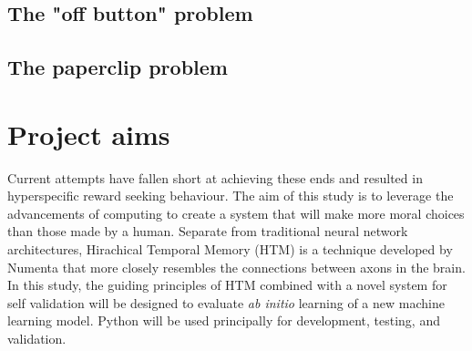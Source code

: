 \subsection{The "off button" problem}
\subsection{The paperclip problem}

\section{Project aims}
Current attempts have fallen short at achieving these ends and resulted in hyperspecific reward seeking behaviour.
The aim of this study is to leverage the advancements of computing to create a system that will make more moral choices than those made by a human.
Separate from traditional neural network architectures, Hirachical Temporal Memory (HTM) is a technique developed by Numenta that more closely resembles the connections between axons in the brain.
In this study, the guiding principles of HTM combined with a novel system for self validation will be designed to evaluate \emph{ab initio} learning of a new machine learning model.
Python will be used principally for development, testing, and validation.
